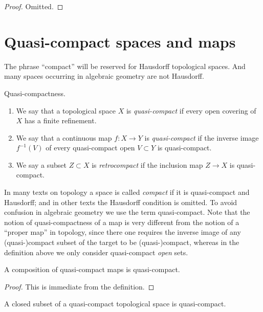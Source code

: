 \begin{proof}
Omitted.
\end{proof}







\section{Quasi-compact spaces and maps}
\label{section-quasi-compact}

\noindent
The phrase ``compact'' will be reserved
for Hausdorff topological spaces. And many spaces occurring
in algebraic geometry are not Hausdorff.

\begin{definition}
\label{definition-quasi-compact}
Quasi-compactness.
\begin{enumerate}
\item We say that a topological space $X$ is {\it quasi-compact}
if every open covering of $X$ has a finite refinement.
\item We say that a continuous map $f : X \to Y$ is {\it quasi-compact}
if the inverse image $f^{-1}(V)$ of every quasi-compact open $V \subset Y$
is quasi-compact.
\item We say a subset $Z \subset X$ is {\it retrocompact}
if the inclusion map $Z \to X$ is quasi-compact.
\end{enumerate}
\end{definition}

\noindent
In many texts on topology a space is called {\it compact} if it
is quasi-compact and Hausdorff; and in other texts the Hausdorff
condition is omitted. To avoid confusion in algebraic geometry
we use the term quasi-compact. Note that the notion of quasi-compactness
of a map is very different from the notion of a ``proper map''
in topology, since there one requires the inverse image of any
(quasi-)compact subset of the target to be (quasi-)compact,
whereas in the definition above we only consider quasi-compact
{\it open} sets.

\begin{lemma}
\label{lemma-composition-quasi-compact}
A composition of quasi-compact maps is quasi-compact.
\end{lemma}

\begin{proof}
This is immediate from the definition.
\end{proof}

\begin{lemma}
\label{lemma-closed-in-quasi-compact}
A closed subset of a quasi-compact topological space is quasi-compact.
\end{lemma}

